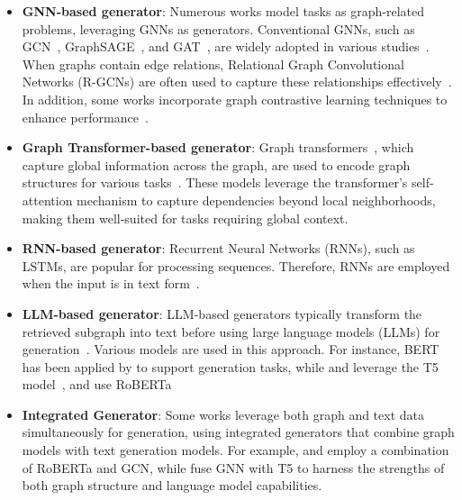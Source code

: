 \begin{itemize}[leftmargin=*]
    \item \textbf{GNN-based generator}: Numerous works model tasks as graph-related problems, leveraging GNNs as generators. Conventional GNNs, such as GCN~\citep{kipf2016semi}, GraphSAGE~\citep{hamilton2017inductive}, and GAT~\citep{velivckovic2017graph}, are widely adopted in various studies~\citep{peng2024connecting, thayaparan2019identifying, yasunaga2017graph, munikoti2023atlantic, pan2020semantic, dong2024don}. When graphs contain edge relations, Relational Graph Convolutional Networks (R-GCNs) are often used to capture these relationships effectively~\citep{de2018question, min2019knowledge}. In addition, some works incorporate graph contrastive learning techniques to enhance performance~\citep{xie2022gretel, zhang2022ke, hemmati2023multi}.
    \item \textbf{Graph Transformer-based generator}: Graph transformers~\citep{yun2019graph}, which capture global information across the graph, are used to encode graph structures for various tasks~\citep{zhang2020text, mei2021graph}. These models leverage the transformer’s self-attention mechanism to capture dependencies beyond local neighborhoods, making them well-suited for tasks requiring global context.
    \item  \textbf{RNN-based generator}: Recurrent Neural Networks (RNNs), such as LSTMs, are popular for processing sequences. Therefore, RNNs are employed when the input is in text form~\citep{song2018exploring}.
    \item \textbf{LLM-based generator}: LLM-based generators typically transform the retrieved subgraph into text before using large language models (LLMs) for generation~\citep{wang2024knowledge, edge2024local}. Various models are used in this approach. For instance, BERT~\citep{devlin2018bert} has been applied by \cite{tu2020select, li2022mutually, zhang2021answering} to support generation tasks, while \citet{yu2021kg} and \citet{ju2022grape} leverage the T5 model~\citep{raffel2020exploring}, and \citet{chen2020improving} use RoBERTa~\citep{liu2019roberta}
    \item \textbf{Integrated Generator}: Some works leverage both graph and text data simultaneously for generation, using integrated generators that combine graph models with text generation models. For example, \citet{xu2021dynamic} and \citet{wang2023docgraphlm} employ a combination of RoBERTa and GCN, while \citet{ramesh2023single} fuse GNN with T5 to harness the strengths of both graph structure and language model capabilities.
\end{itemize}

